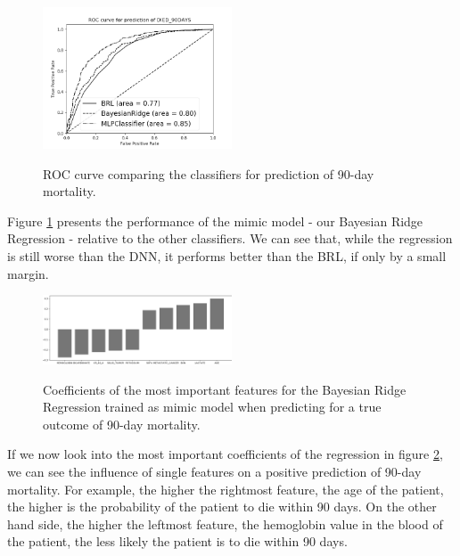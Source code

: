 \documentclass[conference,comsoc]{IEEEtran}
\begin{document}
\begin{figure}[h]
	\includegraphics[width=0.5\textwidth]{ROC_DIED_90DAYS.png}
	\label{fig:mortalityROC}
	\caption{ROC curve comparing the classifiers for prediction of 90-day mortality.}
\end{figure}

Figure \ref{fig:mortalityROC} presents the performance of the mimic model - our Bayesian Ridge Regression - relative to the other classifiers.
We can see that, while the regression is still worse than the DNN, it performs better than the BRL, if only by a small margin. \\

\begin{figure}[h]
	\includegraphics[width=0.5\textwidth]{coef_DIED_90DAYS.png}
	\label{fig:mortalityCOEF}
	\caption{Coefficients of the most important features for the Bayesian Ridge Regression trained as mimic model when predicting for a true outcome of 90-day mortality.}
\end{figure}

If we now look into the most important coefficients of the regression in figure \ref{fig:mortalityCOEF}, we can see the influence of single features on a positive prediction of 90-day mortality.
For example, the higher the rightmost feature, the age of the patient, the higher is the probability of the patient to die within 90 days.
On the other hand side, the higher the leftmost feature, the hemoglobin value in the blood of the patient, the less likely the patient is to die within 90 days.

\newpage
\end{document}
